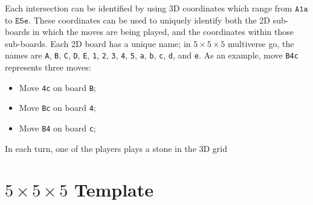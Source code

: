 \documentclass{article}
\begin{document}
Each intersection can be identified by using 3D coordinates which range from
$\texttt{A1a}$ to $\texttt{E5e}$.  These coordinates can be used to uniquely
identify both the 2D sub-boards in which the moves are being played, and the
coordinates within those sub-boards.
%
Each 2D board has a unique name;  in $5\times 5\times 5$ multiverse go, the
names are 
%
\texttt{A}, \texttt{B}, \texttt{C}, \texttt{D}, \texttt{E},
%
\texttt{1}, \texttt{2}, \texttt{3}, \texttt{4}, \texttt{5},
%
\texttt{a}, \texttt{b}, \texttt{c}, \texttt{d}, and \texttt{e}.
%
As an example, move \texttt{B4c} represents three moves:
%
\begin{itemize}
  \item Move \texttt{4c} on board \texttt{B};
  \item Move \texttt{Bc} on board \texttt{4};
  \item Move \texttt{B4} on board \texttt{c};
\end{itemize}

In each turn, one of the players
plays a stone in the 3D grid

\section*{$5\times 5\times 5$ Template}
\end{document}
